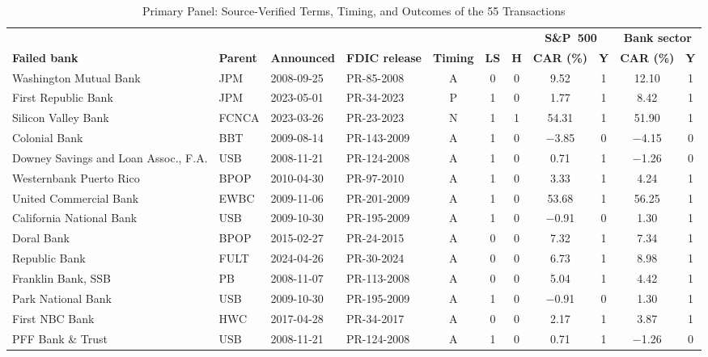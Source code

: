 \begin{table}[!t]
\caption{Primary Panel: Source-Verified Terms, Timing, and Outcomes of the 55 Transactions}
\label{tab:appendix}
\centering
\scriptsize
\setlength{\tabcolsep}{3pt}
\renewcommand{\arraystretch}{0.95}
\begin{tabular*}{\textwidth}{@{\extracolsep{\fill}}llllccccccc}
\toprule
 & & & & & & & \multicolumn{2}{c}{\textbf{S\&P~500}} & \multicolumn{2}{c}{\textbf{Bank sector}} \\
\cmidrule(lr){8-9}\cmidrule(lr){10-11}
\textbf{Failed bank} & \textbf{Parent} & \textbf{Announced} & \textbf{FDIC release} & \textbf{Timing} & \textbf{LS} & \textbf{H} & \textbf{CAR (\%)} & \textbf{Y} & \textbf{CAR (\%)} & \textbf{Y} \\
\midrule
Washington Mutual Bank & JPM & 2008-09-25 & PR-85-2008 & A & 0 & 0 & 9.52 & 1 & 12.10 & 1 \\
First Republic Bank & JPM & 2023-05-01 & PR-34-2023 & P & 1 & 0 & 1.77 & 1 & 8.42 & 1 \\
Silicon Valley Bank & FCNCA & 2023-03-26 & PR-23-2023 & N & 1 & 1 & 54.31 & 1 & 51.90 & 1 \\
Colonial Bank & BBT & 2009-08-14 & PR-143-2009 & A & 1 & 0 & $-$3.85 & 0 & $-$4.15 & 0 \\
Downey Savings and Loan Assoc., F.A. & USB & 2008-11-21 & PR-124-2008 & A & 1 & 0 & 0.71 & 1 & $-$1.26 & 0 \\
Westernbank Puerto Rico & BPOP & 2010-04-30 & PR-97-2010 & A & 1 & 0 & 3.33 & 1 & 4.24 & 1 \\
United Commercial Bank & EWBC & 2009-11-06 & PR-201-2009 & A & 1 & 0 & 53.68 & 1 & 56.25 & 1 \\
California National Bank & USB & 2009-10-30 & PR-195-2009 & A & 1 & 0 & $-$0.91 & 0 & 1.30 & 1 \\
Doral Bank & BPOP & 2015-02-27 & PR-24-2015 & A & 0 & 0 & 7.32 & 1 & 7.34 & 1 \\
Republic Bank & FULT & 2024-04-26 & PR-30-2024 & A & 0 & 0 & 6.73 & 1 & 8.98 & 1 \\
Franklin Bank, SSB & PB & 2008-11-07 & PR-113-2008 & A & 0 & 0 & 5.04 & 1 & 4.42 & 1 \\
Park National Bank & USB & 2009-10-30 & PR-195-2009 & A & 1 & 0 & $-$0.91 & 0 & 1.30 & 1 \\
First NBC Bank & HWC & 2017-04-28 & PR-34-2017 & A & 0 & 0 & 2.17 & 1 & 3.87 & 1 \\
PFF Bank \& Trust & USB & 2008-11-21 & PR-124-2008 & A & 1 & 0 & 0.71 & 1 & $-$1.26 & 0 \\

\end{tabular*}
\end{table}
